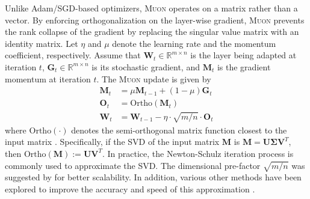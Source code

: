 \documentclass{article}
\newcommand{\mat}[1]{\mathbf{#1}}
\theoremstyle{plain}
\theoremstyle{definition}
\theoremstyle{remark}
\begin{document}
Unlike Adam/SGD-based optimizers, \textsc{Muon} \cite{jordan2024muon} operates on a matrix rather than a vector. By enforcing orthogonalization on the layer-wise gradient, \textsc{Muon} prevents the rank collapse of the gradient by replacing the singular value matrix with an identity matrix. Let $\eta$ and $\mu$ denote the learning rate and the momentum coefficient, respectively. Assume that $\mat{W}_t \in \mathbb{R}^{m \times n}$ is the layer being adapted at iteration $t$, $\mat{G}_t \in \mathbb{R}^{m \times n}$ is its stochastic gradient, and $\mat{M}_t$ is the gradient momentum at iteration $t$. The \textsc{Muon} update is given by
\vspace{-3pt}
\begin{equation}
\begin{aligned}
\mat{M}_t &= \mu \mat{M}_{t-1} + (1 - \mu) \mat{G}_t \\
\mat{O}_t &= \mathrm{Ortho}(\mat{M}_t) \\
\mat{W}_{t} &= \mat{W}_{t-1} - \eta \cdot \sqrt{m/n} \cdot \mat{O}_t
\end{aligned}
\end{equation}
where $\mathrm{Ortho}(\cdot)$ denotes the semi-orthogonal matrix function closest to the input matrix \cite{higham2008functions}. Specifically, if the SVD of the input matrix $\mat{M}$ is $\mat{M} = \mat{U} \mat{\Sigma} \mat{V}^T$, then $\mathrm{Ortho}(\mat{M}) := \mat{U} \mat{V}^T$. In practice, the Newton-Schulz iteration process \cite{higham2008functions} is commonly used to approximate the SVD. The dimensional pre-factor $\sqrt{m/n}$ was suggested by \cite{bernstein2025deriving} for better scalability. In addition, various other methods have been explored to improve the accuracy and speed of this approximation \cite{amsel2025polar, cesista2025muonoptcoeffs}.

\vspace{-5pt}
\end{document}

